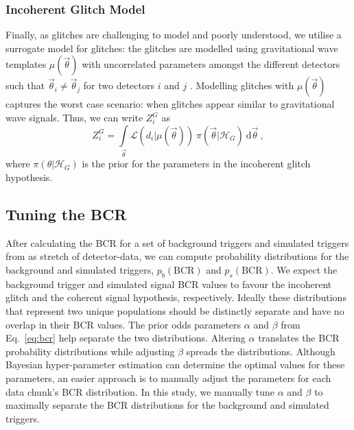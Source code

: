 \documentclass[%
preprint,
 amsmath,amssymb,
 aps,
]{revtex4}
\newcommand{\bcr}{{\sc BCR}\xspace}
\newcommand{\template}{{\sc $\mu(\vec{\theta})$}\xspace}
\begin{document}
\subsubsection{Incoherent Glitch Model}
Finally, as glitches are challenging to model and poorly understood, we utilise a surrogate model for glitches: the glitches are modelled using gravitational wave templates  \template with uncorrelated  parameters amongst the different detectors such that  $\vec{\theta}_i \neq \vec{\theta}_j$ for two detectors $i$ and $j$ \cite{bci}.  Modelling glitches with \template captures the worst case scenario: when glitches appear similar to gravitational wave signals. Thus, we can write $Z^G_i$ as 
\begin{equation}
\label{eq:zg}
Z^G_i = \int\limits_{\vec{\theta}} \mathcal{L}(d_i|\mu(\vec{\theta}))\ \pi(\vec{\theta}| \mathcal{H}_G)\  \text{d}\vec{\theta}  \ ,
\end{equation}
where $\pi(\theta| \mathcal{H}_G)$ is the prior for the parameters in the incoherent glitch hypothesis. 

\subsection{Tuning the BCR}

After calculating the \bcr for a set of background triggers and simulated triggers from as stretch of detector-data, we can compute probability distributions for the background and simulated triggers, $p_b(\text{BCR})$ and $p_s(\text{BCR})$. We expect the background trigger and simulated signal \bcr values to favour the incoherent glitch and the coherent signal hypothesis, respectively. Ideally these distributions that represent two unique populations should be distinctly separate and have no overlap in their \bcr values. The prior odds parameters $\alpha$ and $\beta$ from Eq.~\ref{eq:bcr} help separate the two distributions. Altering $\alpha$ translates the \bcr probability distributions while adjusting $\beta$ spreads the distributions. Although Bayesian hyper-parameter estimation can determine the optimal values for these parameters, an easier approach is to manually adjust the parameters for each data chunk's \bcr distribution. In this study, we manually tune $\alpha$ and $\beta$ to maximally separate the \bcr distributions for the background and simulated triggers. \\
\end{document}
